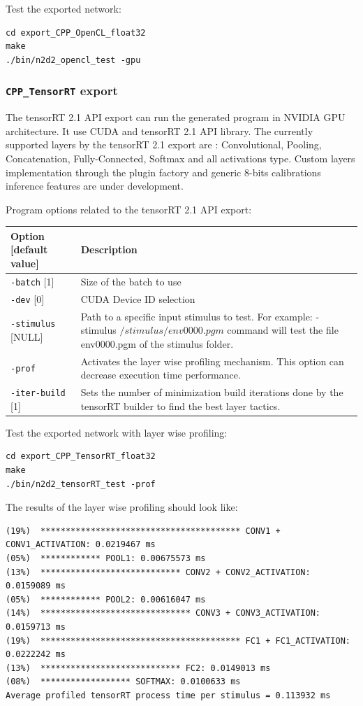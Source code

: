 \documentclass[a4paper,11pt,oneside]{article}
\begin{document}
Test the exported network:
\begin{lstlisting}
cd export_CPP_OpenCL_float32
make
./bin/n2d2_opencl_test -gpu
\end{lstlisting}

\subsubsection{\texorpdfstring{%
\lstinline[basicstyle=\ttfamily\bfseries]!CPP_TensorRT! export}{CPP\_TensorRT export}}
The tensorRT 2.1 API export can run the generated program in NVIDIA GPU architecture.
It use CUDA and tensorRT 2.1 API library.
The currently supported layers by the tensorRT 2.1 export are : Convolutional, Pooling, Concatenation,
Fully-Connected, Softmax and all activations type.
Custom layers implementation through the plugin factory and
 generic 8-bits calibrations inference features are under development.

Program options related to the tensorRT 2.1 API export:
\begin{center}
 \begin{tabular}{| p{5cm} | p{10cm} | }
 \hline
 Option [default value] & Description\\
 \hline\hline
  \lstinline!-batch! [1] & Size of the batch to use \\
  \lstinline!-dev! [0] & CUDA Device ID selection  \\
  \lstinline!-stimulus! [NULL] & Path to a specific input stimulus to test.
  For example: -stimulus ${/stimulus/env0000.pgm}$ command will test the file
   env0000.pgm  of the stimulus folder.\\
  \lstinline!-prof! & Activates the layer wise profiling mechanism. This option
  can decrease execution time performance.\\
  \lstinline!-iter-build! [1] & Sets the number of minimization build iterations
  done by the tensorRT builder to find the best layer tactics.\\
 \hline
\end{tabular}
\end{center}

Test the exported network with layer wise profiling:
\begin{lstlisting}
cd export_CPP_TensorRT_float32
make
./bin/n2d2_tensorRT_test -prof
\end{lstlisting}

The results of the layer wise profiling should look like:
\begin{lstlisting}[style=console]
(19%)  **************************************** CONV1 + CONV1_ACTIVATION: 0.0219467 ms
(05%)  ************ POOL1: 0.00675573 ms
(13%)  **************************** CONV2 + CONV2_ACTIVATION: 0.0159089 ms
(05%)  ************ POOL2: 0.00616047 ms
(14%)  ****************************** CONV3 + CONV3_ACTIVATION: 0.0159713 ms
(19%)  **************************************** FC1 + FC1_ACTIVATION: 0.0222242 ms
(13%)  **************************** FC2: 0.0149013 ms
(08%)  ****************** SOFTMAX: 0.0100633 ms
Average profiled tensorRT process time per stimulus = 0.113932 ms

\end{lstlisting}
\end{document}
